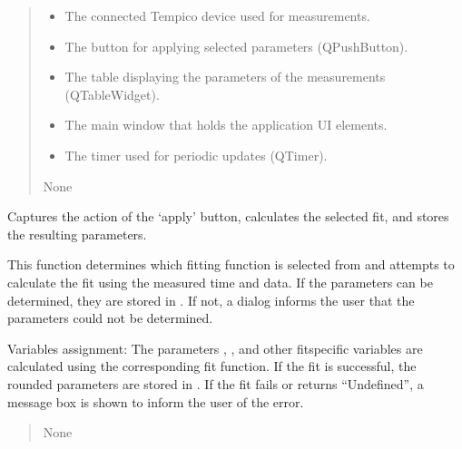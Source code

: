 \documentclass[letterpaper,10pt,english]{sphinxmanual}
\begin{document}
\begin{fulllineitems}
\begin{quote}
\begin{description}
\begin{itemize}
\item {} 
\sphinxAtStartPar
{} \textendash{} The connected Tempico device used for measurements.

\item {} 
\sphinxAtStartPar
{} \textendash{} The button for applying selected parameters (QPushButton).

\item {} 
\sphinxAtStartPar
{} \textendash{} The table displaying the parameters of the measurements (QTableWidget).

\item {} 
\sphinxAtStartPar
{} \textendash{} The main window that holds the application UI elements.

\item {} 
\sphinxAtStartPar
{} \textendash{} The timer used for periodic updates (QTimer).

\end{itemize}

\sphinxAtStartPar
None

\end{description}\end{quote}

\begin{fulllineitems}
\label{\detokenize{FLIMGraphics:FLIMGraphics.FLIMGraphic.applyAction}}
\pysigstartsignatures
{}
\pysigstopsignatures
\sphinxAtStartPar
Captures the action of the ‘apply’ button, calculates the selected fit, and stores the resulting parameters.

\sphinxAtStartPar
This function determines which fitting function is selected from  and attempts to calculate
the fit using the measured time and data. If the parameters can be determined, they are stored in .
If not, a dialog informs the user that the parameters could not be determined.

\sphinxAtStartPar
Variables assignment:
\sphinxhyphen{} The parameters , , and other fit\sphinxhyphen{}specific variables are calculated using the corresponding fit function.
\sphinxhyphen{} If the fit is successful, the rounded parameters are stored in .
\sphinxhyphen{} If the fit fails or returns “Undefined”, a message box is shown to inform the user of the error.
\begin{quote}\begin{description}
\sphinxAtStartPar
None


\end{description}
\end{quote}
\end{fulllineitems}
\end{fulllineitems}
\end{document}
